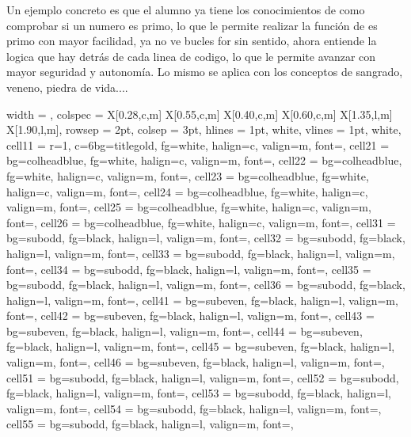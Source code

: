 \documentclass[a4paper,12pt]{article}
\begin{document}
Un ejemplo concreto es que el alumno ya tiene los conocimientos de como comprobar si un numero es primo,
lo que le permite realizar la función de es primo con mayor facilidad, ya no ve bucles for sin sentido,
ahora entiende la logica que hay detrás de cada linea de codigo, lo que le permite avanzar con mayor seguridad y autonomía.
Lo mismo se aplica con los conceptos de sangrado, veneno, piedra de vida....

\noindent
\begin{longtblr}{
  width = \textwidth,
  colspec = {X[0.28,c,m] X[0.55,c,m] X[0.40,c,m] X[0.60,c,m] X[1.35,l,m] X[1.90,l,m]},
  rowsep = 2pt,
  colsep = 3pt,
  hlines = {1pt, white},
  vlines = {1pt, white},
  cell{1}{1} = {r=1, c=6}{bg=titlegold, fg=white, halign=c, valign=m, font=\large\bfseries},
  cell{2}{1} = {bg=colheadblue, fg=white, halign=c, valign=m, font=\bfseries},
  cell{2}{2} = {bg=colheadblue, fg=white, halign=c, valign=m, font=\bfseries},
  cell{2}{3} = {bg=colheadblue, fg=white, halign=c, valign=m, font=\bfseries},
  cell{2}{4} = {bg=colheadblue, fg=white, halign=c, valign=m, font=\bfseries},
  cell{2}{5} = {bg=colheadblue, fg=white, halign=c, valign=m, font=\bfseries},
  cell{2}{6} = {bg=colheadblue, fg=white, halign=c, valign=m, font=\bfseries},
  cell{3}{1} = {bg=subodd, fg=black, halign=l, valign=m, font=\footnotesize},
  cell{3}{2} = {bg=subodd, fg=black, halign=l, valign=m, font=\footnotesize},
  cell{3}{3} = {bg=subodd, fg=black, halign=l, valign=m, font=\footnotesize},
  cell{3}{4} = {bg=subodd, fg=black, halign=l, valign=m, font=\footnotesize},
  cell{3}{5} = {bg=subodd, fg=black, halign=l, valign=m, font=\footnotesize},
  cell{3}{6} = {bg=subodd, fg=black, halign=l, valign=m, font=\footnotesize},
  cell{4}{1} = {bg=subeven, fg=black, halign=l, valign=m, font=\footnotesize},
  cell{4}{2} = {bg=subeven, fg=black, halign=l, valign=m, font=\footnotesize},
  cell{4}{3} = {bg=subeven, fg=black, halign=l, valign=m, font=\footnotesize},
  cell{4}{4} = {bg=subeven, fg=black, halign=l, valign=m, font=\footnotesize},
  cell{4}{5} = {bg=subeven, fg=black, halign=l, valign=m, font=\footnotesize},
  cell{4}{6} = {bg=subeven, fg=black, halign=l, valign=m, font=\footnotesize},
  cell{5}{1} = {bg=subodd, fg=black, halign=l, valign=m, font=\footnotesize},
  cell{5}{2} = {bg=subodd, fg=black, halign=l, valign=m, font=\footnotesize},
  cell{5}{3} = {bg=subodd, fg=black, halign=l, valign=m, font=\footnotesize},
  cell{5}{4} = {bg=subodd, fg=black, halign=l, valign=m, font=\footnotesize},
  cell{5}{5} = {bg=subodd, fg=black, halign=l, valign=m, font=\footnotesize},
}
\end{longtblr}
\end{document}
